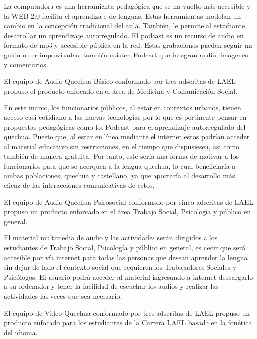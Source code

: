 La computadora es una herramienta pedag\'{o}gica que se ha vuelto m\'{a}s 
accesible y la WEB 2.0 facilita el aprendizaje de lenguas.
Estas herramientas modelan un cambio en la concepci\'{o}n tradicional del aula.
Tambi\'{e}n, le permite al estudiante desarrollar un aprendizaje autorregulado.
El podcast es un recurso de audio en formato de mp3 y accesible p\'{u}blica en
la red. Estas grabaciones pueden seguir un gui\'{o}n o ser improvisadas,
tambi\'{e}n existen Podcast que integran audio, im\'{a}genes y comentarios.
\cite{AFSTVV2015}

El equipo de Audio Quechua B\'{a}sico conformado por tres adscritas de LAEL
propuso el producto enfocado en el \'{a}rea de Medicina y Comunicaci\'{o}n
Social. 

En este marco, los funcionarios p\'{u}blicos, al estar en contextos urbanos,
tienen acceso casi cotidiano a las nuevas tecnolog\'{i}as por lo que es 
pertinente pensar en propuestas pedag\'{o}gicas como los Podcast para el
aprendizaje autorregulado del quechua. Puesto que, al estar en l\'{i}nea
mediante el internet estos podr\'{i}an acceder al material educativo sin
restricciones, en el tiempo que dispusiesen, asi como tambi\'{e}n de manera
gratuita. Por tanto, este ser\'{i}a una forma de motivar a los funcionarios
para que se acerquen a la lengua quechua, lo cual beneficiar\'{i}a a ambas
poblaciones, quechua y castellano, ya que aportar\'{i}a al desarrollo
m\'{a}s eficaz de las interacciones comunicativas de estos.\cite{CCZ2015}

El equipo de  Audio Quechua Psicosocial conformado por cinco adscritas de LAEL
propuso un producto enforcado en el \'{a}rea Trabajo Social, Psicolog\'{i}a y
p\'{u}blico en general.

El material multimedia de audio y las actividades ser\'{a}n dirigidos a los 
estudiantes de Trabajo Social, Psicolog\'{i}a y p\'{u}blico en general, es 
decir que ser\'{a} accesible por v\'{i}a internet para todas las personas que
desean aprender la lengua sin dejar de lado el contexto social que requieren
los Trabajadores Sociales y Psic\'{o}logos. El usuario podr\'{a} acceder al
material ingresando a internet descargarlo a su ordenador y tener la facilidad
de escuchar los audios y realizar las actividades las veces que sea necesario.
\cite{BDFJR2015}

El equipo de Video Quechua conformado por tres adscritas de LAEL propuso un 
producto enfocado para los estudiantes de la Carrera LAEL basado en la 
fon\'{e}tica del idioma.

